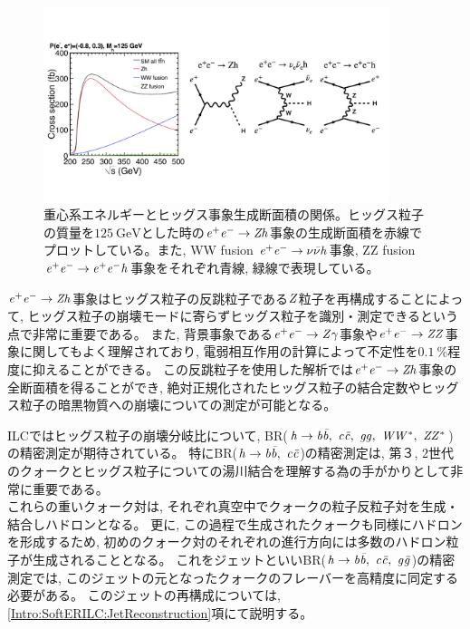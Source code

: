 \begin{figure}[htbp]
 \centering
 \includegraphics[trim= 0 50 0 50, width=0.9\textwidth, clip]{Figure/1Introduction/4eetoZH.png}
 \caption[重心系エネルギーとヒッグス事象生成断面積の関係]{重心系エネルギーとヒッグス事象生成断面積の関係\cite{ILCTDRVP}。ヒッグス粒子の質量を$125\ \mathrm{GeV}$とした時の$\it e^+e^- \to Zh$事象の生成断面積を赤線でプロットしている。また, WW fusion $\it e^+e^- \to \nu \bar{\nu} h$事象, ZZ fusion $\it e^+e^- \to e^+ e^- h$事象をそれぞれ青線, 緑線で表現している。}
 \label{4eetoZH}
\end{figure}

$\it e^+e^- \to Zh$事象はヒッグス粒子の反跳粒子である$\it Z$粒子を再構成することによって, ヒッグス粒子の崩壊モードに寄らずヒッグス粒子を識別・測定できるという点で非常に重要である。
また, 背景事象である$\it e^+e^- \to Z\gamma$事象や$\it e^+e^- \to ZZ$事象に関してもよく理解されており, 電弱相互作用の計算によって不定性を$0.1\ \%$程度に抑えることができる\cite{GlobalProject}。
この反跳粒子を使用した解析では$\it e^+e^- \to Zh$事象の全断面積を得ることができ, 絶対正規化されたヒッグス粒子の結合定数やヒッグス粒子の暗黒物質への崩壊についての測定が可能となる。

ILCではヒッグス粒子の崩壊分岐比について, BR($\it h \to b \bar{b},\ c \bar{c},\ gg,\ WW^*,\ ZZ^*$)の精密測定が期待されている。
特にBR($\it h \to b \bar{b},\ c \bar{c}$)の精密測定は, 第３, 2世代のクォークとヒッグス粒子についての湯川結合を理解する為の手がかりとして非常に重要である。\\

\newpage
これらの重いクォーク対は, それぞれ真空中でクォークの粒子反粒子対を生成・結合しハドロンとなる。
更に, この過程で生成されたクォークも同様にハドロンを形成するため, 初めのクォーク対のそれぞれの進行方向には多数のハドロン粒子が生成されることとなる。
これをジェットといいBR($\it h \to b \bar{b},\ c \bar{c},\ g \bar{g}$)の精密測定では, このジェットの元となったクォークのフレーバーを高精度に同定する必要がある。
このジェットの再構成については, \ref{Intro:SoftERILC:JetReconstruction}項にて説明する。


